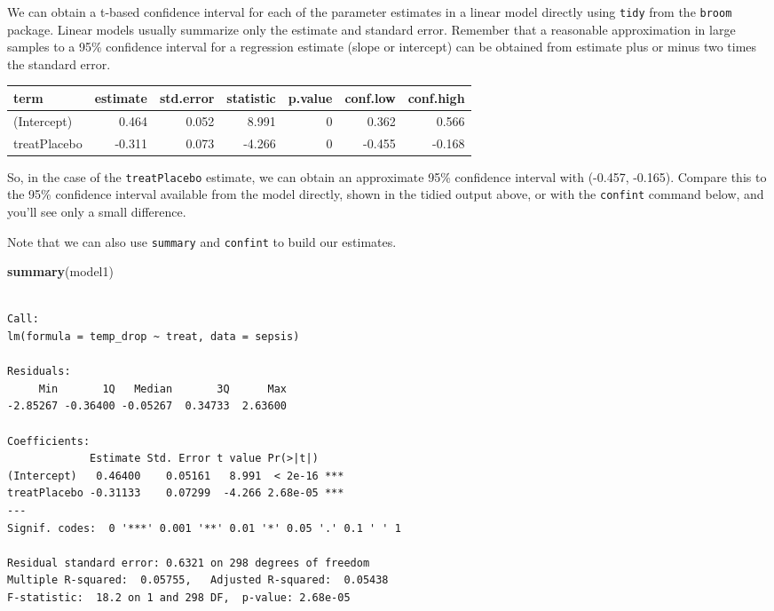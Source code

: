 \documentclass[
]{book}
\newenvironment{Shaded}{\begin{snugshade}}{\end{snugshade}}
\newcommand{\DataTypeTok}[1]{\textcolor[rgb]{0.13,0.29,0.53}{#1}}
\newcommand{\DecValTok}[1]{\textcolor[rgb]{0.00,0.00,0.81}{#1}}
\newcommand{\FloatTok}[1]{\textcolor[rgb]{0.00,0.00,0.81}{#1}}
\newcommand{\KeywordTok}[1]{\textcolor[rgb]{0.13,0.29,0.53}{\textbf{#1}}}
\newcommand{\NormalTok}[1]{#1}
\newcommand{\OperatorTok}[1]{\textcolor[rgb]{0.81,0.36,0.00}{\textbf{#1}}}
\newcommand{\OtherTok}[1]{\textcolor[rgb]{0.56,0.35,0.01}{#1}}
\newcommand{\StringTok}[1]{\textcolor[rgb]{0.31,0.60,0.02}{#1}}
\begin{document}
We can obtain a t-based confidence interval for each of the parameter estimates in a linear model directly using \texttt{tidy} from the \texttt{broom} package. Linear models usually summarize only the estimate and standard error. Remember that a reasonable approximation in large samples to a 95\% confidence interval for a regression estimate (slope or intercept) can be obtained from estimate plus or minus two times the standard error.

\begin{Shaded}
\end{Shaded}

\begin{tabular}{l|r|r|r|r|r|r}
\hline
term & estimate & std.error & statistic & p.value & conf.low & conf.high\\
\hline
(Intercept) & 0.464 & 0.052 & 8.991 & 0 & 0.362 & 0.566\\
\hline
treatPlacebo & -0.311 & 0.073 & -4.266 & 0 & -0.455 & -0.168\\
\hline
\end{tabular}

So, in the case of the \texttt{treatPlacebo} estimate, we can obtain an approximate 95\% confidence interval with (-0.457, -0.165). Compare this to the 95\% confidence interval available from the model directly, shown in the tidied output above, or with the \texttt{confint} command below, and you'll see only a small difference.

Note that we can also use \texttt{summary} and \texttt{confint} to build our estimates.

\begin{Shaded}
\begin{Highlighting}[]
\KeywordTok{summary}\NormalTok{(model1)}
\end{Highlighting}
\end{Shaded}

\begin{verbatim}

Call:
lm(formula = temp_drop ~ treat, data = sepsis)

Residuals:
     Min       1Q   Median       3Q      Max 
-2.85267 -0.36400 -0.05267  0.34733  2.63600 

Coefficients:
             Estimate Std. Error t value Pr(>|t|)    
(Intercept)   0.46400    0.05161   8.991  < 2e-16 ***
treatPlacebo -0.31133    0.07299  -4.266 2.68e-05 ***
---
Signif. codes:  0 '***' 0.001 '**' 0.01 '*' 0.05 '.' 0.1 ' ' 1

Residual standard error: 0.6321 on 298 degrees of freedom
Multiple R-squared:  0.05755,	Adjusted R-squared:  0.05438 
F-statistic:  18.2 on 1 and 298 DF,  p-value: 2.68e-05
\end{verbatim}
\end{document}
